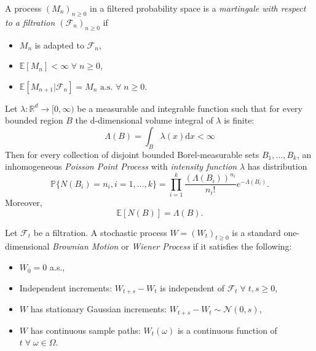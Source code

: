 \begin{definition}[Martingales]
    A process $(M_n)_{n\geq0}$ in a filtered probability space is a
    \emph{martingale with respect to a filtration $(\mathcal{F}_n)_{n\geq0}$}
    if
    \begin{itemize}
        \item $M_n$ is adapted to $\mathcal{F}_n$,
        \item $\mathbb{E}[M_n]<\infty\;\forall\;n\geq0$,
        \item $\mathbb{E}[M_{n+1}|\mathcal{F}_n]=M_n\textrm{ a.s. }\forall\;n\geq0.$
    \end{itemize}
\end{definition}

\begin{definition}
    Let $\lambda:\mathbb{R}^d\rightarrow[0,\infty)$ be a measurable and
    integrable function such that for every bounded region $B$ the d-dimensional
    volume integral of $\lambda$ is finite:
    \begin{equation}
        \Lambda(B)=\int_B\lambda(x)\mathrm dx<\infty
    \end{equation}
    Then for every collection of disjoint bounded Borel-measurable sets
    $B_1,\dots,B_k$, an inhomogeneous \emph{Poisson Point Process} with
    \emph{intensity function} $\lambda$ has distribution
    \begin{equation}
        \mathbb{P}\{N(B_i)=n_i,i=1,\dots,k\}=\prod_{i=1}^k\frac{(\Lambda(B_i))^{n_i}}{n_i!}e^{-\Lambda(B_i)}.
    \end{equation}
    Moreover,
    \begin{equation}
        \mathbb{E}[N(B)]=\Lambda(B).
    \end{equation}
\end{definition}

\begin{definition}
    Let $\mathcal{F}_t$ be a filtration. A stochastic process $W=(W_t)_{t\geq0}$
    is a standard one-dimensional \emph{Brownian Motion} or \emph{Wiener Process}
    if it satisfies the following:
    \begin{itemize}
        \item $W_0=0$ a.s.,
        \item Independent increments: $W_{t+s}-W_t$ is independent of $\mathcal{F}_t\;\forall\;t,s\geq0$,
        \item $W$ has stationary Gaussian increments: $W_{t+s}-W_t\sim\mathcal{N}(0,s)$,
        \item $W$ has continuous sample paths: $W_t(\omega)$ is a continuous function of $t\;\forall\;\omega\in\Omega$.
    \end{itemize}
\end{definition}

